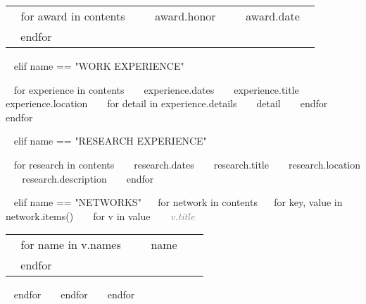 \begin{minipage}{\textwidth}
\begin{tabular}{ p{} %
                 p{} 
                 p{}} %
  ~{ for award in contents }~
  \small\textcolor{gray}{{\emph{  }}} & ~{{ award.honor }}~ & {\hfill \small{~{{ award.date }}~}}\\
  ~{ endfor }~
\end{tabular}


~{ elif name == "WORK EXPERIENCE" }~
\begin{entrylist}
~{ for experience in contents }~
  \entry
    {~{{ experience.dates }}~}
    {~{{ experience.title }}~}
    {~{{ experience.location }}~}
    {~{ for detail in experience.details }~ ~{{ detail }}~ ~{ endfor }~}
~{ endfor }~
\end{entrylist}
  


~{ elif name == "RESEARCH EXPERIENCE" }~
\begin{entrylist}
~{ for research in contents }~
  \entry
    {~{{ research.dates }}~}
    {~{{ research.title }}~}
    {~{{ research.location }}~}
    {~{{ research.description }}~}
~{ endfor }~
\end{entrylist}

% 

~{ elif name == "NETWORKS" }~
~{for network in contents}~
  ~{ for key, value in network.items() }~
    ~{ for v in value }~
       \textcolor{gray}{{\emph{~{{ v.title }}~}}} 
       \begin{tabular}{ p{} %
                        p{} 
                        p{}} %
      ~{ for name in v.names }~ 
      \small &  ~{{ name }}~ & {\hfill}\\ 
      ~{ endfor }~
      \end{tabular}
    ~{ endfor }~
  ~{ endfor }~
~{ endfor }~ 



\end{minipage}
